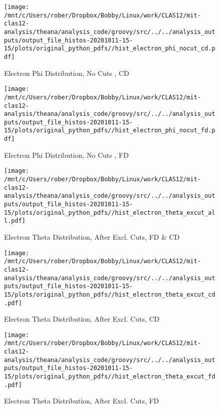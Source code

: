 \documentclass{article}
\begin{document}
\begin{landscape}
\begin{figure}[h]
        \texttt{[image: /mnt/c/Users/rober/Dropbox/Bobby/Linux/work/CLAS12/mit-clas12-analysis/theana/analysis\_code/groovy/src/../../analysis\_outputs/output\_file\_histos-20201011-15-15/plots/original\_python\_pdfs//hist\_electron\_phi\_nocut\_cd.pdf]}
        \captionsetup{textformat=empty,labelformat=blank}
        \caption{Electron Phi Distribution, No Cuts , CD}
    \end{figure}
    \clearpage
    
    \begin{figure}[h]
        \centering

        \texttt{[image: /mnt/c/Users/rober/Dropbox/Bobby/Linux/work/CLAS12/mit-clas12-analysis/theana/analysis\_code/groovy/src/../../analysis\_outputs/output\_file\_histos-20201011-15-15/plots/original\_python\_pdfs//hist\_electron\_phi\_nocut\_fd.pdf]}
        \captionsetup{textformat=empty,labelformat=blank}
        \caption{Electron Phi Distribution, No Cuts , FD}
    \end{figure}
    \clearpage
    
    \begin{figure}[h]
        \centering

        \texttt{[image: /mnt/c/Users/rober/Dropbox/Bobby/Linux/work/CLAS12/mit-clas12-analysis/theana/analysis\_code/groovy/src/../../analysis\_outputs/output\_file\_histos-20201011-15-15/plots/original\_python\_pdfs//hist\_electron\_theta\_excut\_all.pdf]}
        \captionsetup{textformat=empty,labelformat=blank}
        \caption{Electron Theta Distribution, After Excl. Cuts, FD \& CD}
    \end{figure}
    \clearpage
    
    \begin{figure}[h]
        \centering

        \texttt{[image: /mnt/c/Users/rober/Dropbox/Bobby/Linux/work/CLAS12/mit-clas12-analysis/theana/analysis\_code/groovy/src/../../analysis\_outputs/output\_file\_histos-20201011-15-15/plots/original\_python\_pdfs//hist\_electron\_theta\_excut\_cd.pdf]}
        \captionsetup{textformat=empty,labelformat=blank}
        \caption{Electron Theta Distribution, After Excl. Cuts, CD}
    \end{figure}
    \clearpage
    
    \begin{figure}[h]
        \centering

        \texttt{[image: /mnt/c/Users/rober/Dropbox/Bobby/Linux/work/CLAS12/mit-clas12-analysis/theana/analysis\_code/groovy/src/../../analysis\_outputs/output\_file\_histos-20201011-15-15/plots/original\_python\_pdfs//hist\_electron\_theta\_excut\_fd.pdf]}
        \captionsetup{textformat=empty,labelformat=blank}
        \caption{Electron Theta Distribution, After Excl. Cuts, FD}
    \end{figure}
    \clearpage
    

\end{landscape}
\end{document}
